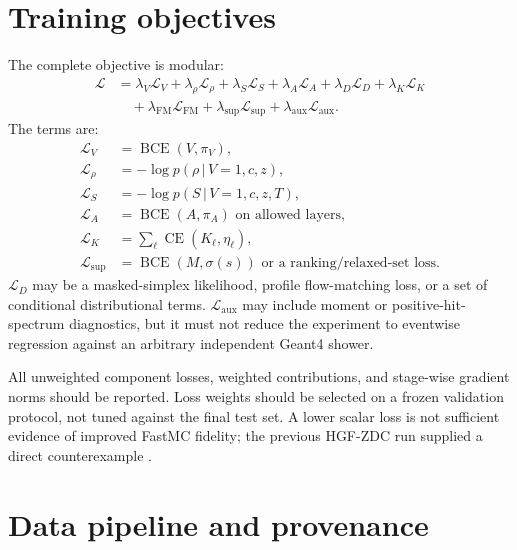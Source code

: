\documentclass[11pt]{article}
\theoremstyle{definition}
\theoremstyle{remark}
\newcommand{\given}{\,\vert\,}
\begin{document}
\section{Training objectives}
The complete objective is modular:
\begin{align}
\mathcal L
&=\lambda_V\mathcal L_V
 +\lambda_\rho\mathcal L_\rho
 +\lambda_S\mathcal L_S
 +\lambda_A\mathcal L_A
 +\lambda_D\mathcal L_D
 +\lambda_K\mathcal L_K \nonumber\\
&\quad+\lambda_{\mathrm{FM}}\mathcal L_{\mathrm{FM}}
 +\lambda_{\mathrm{sup}}\mathcal L_{\mathrm{sup}}
 +\lambda_{\mathrm{aux}}\mathcal L_{\mathrm{aux}}.
\end{align}
The terms are:
\begin{align}
  \mathcal L_V&=\operatorname{BCE}(V,\pi_V),\\
  \mathcal L_\rho&=-\log p(\rho\given V=1,c,z),\\
  \mathcal L_S&=-\log p(S\given V=1,c,z,T),\\
  \mathcal L_A&=\operatorname{BCE}(A,\pi_A)\text{ on allowed layers},\\
  \mathcal L_K&=\sum_\ell\operatorname{CE}(K_\ell,\eta_\ell),\\
  \mathcal L_{\mathrm{sup}}&=\operatorname{BCE}(M,\sigma(s))\text{ or a ranking/relaxed-set loss}.
\end{align}
$\mathcal L_D$ may be a masked-simplex likelihood, profile flow-matching loss, or a set of conditional distributional terms. $\mathcal L_{\mathrm{aux}}$ may include moment or positive-hit-spectrum diagnostics, but it must not reduce the experiment to eventwise regression against an arbitrary independent Geant4 shower.

All unweighted component losses, weighted contributions, and stage-wise gradient norms should be reported. Loss weights should be selected on a frozen validation protocol, not tuned against the final test set. A lower scalar loss is not sufficient evidence of improved FastMC fidelity; the previous HGF-ZDC run supplied a direct counterexample \citep{project_hgf_audit}.

\section{Data pipeline and provenance}
\end{document}
